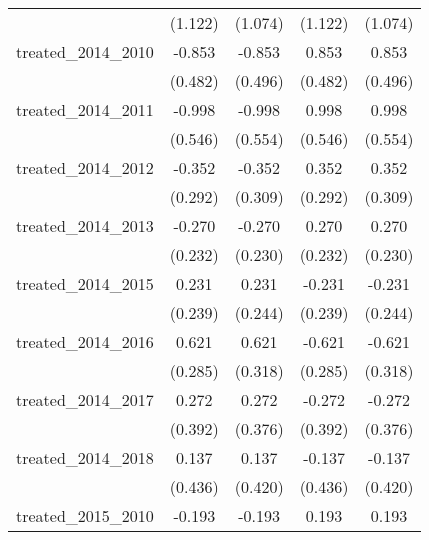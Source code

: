 {\begin{tabular}{l*{4}{c}}
            &     (1.122)         &     (1.074)         &     (1.122)         &     (1.074)         \\
[1em]
treated\_2014\_2010&      -0.853         &      -0.853         &       0.853         &       0.853         \\
            &     (0.482)         &     (0.496)         &     (0.482)         &     (0.496)         \\
[1em]
treated\_2014\_2011&      -0.998         &      -0.998         &       0.998         &       0.998         \\
            &     (0.546)         &     (0.554)         &     (0.546)         &     (0.554)         \\
[1em]
treated\_2014\_2012&      -0.352         &      -0.352         &       0.352         &       0.352         \\
            &     (0.292)         &     (0.309)         &     (0.292)         &     (0.309)         \\
[1em]
treated\_2014\_2013&      -0.270         &      -0.270         &       0.270         &       0.270         \\
            &     (0.232)         &     (0.230)         &     (0.232)         &     (0.230)         \\
[1em]
treated\_2014\_2015&       0.231         &       0.231         &      -0.231         &      -0.231         \\
            &     (0.239)         &     (0.244)         &     (0.239)         &     (0.244)         \\
[1em]
treated\_2014\_2016&       0.621\sym{*}  &       0.621         &      -0.621\sym{*}  &      -0.621         \\
            &     (0.285)         &     (0.318)         &     (0.285)         &     (0.318)         \\
[1em]
treated\_2014\_2017&       0.272         &       0.272         &      -0.272         &      -0.272         \\
            &     (0.392)         &     (0.376)         &     (0.392)         &     (0.376)         \\
[1em]
treated\_2014\_2018&       0.137         &       0.137         &      -0.137         &      -0.137         \\
            &     (0.436)         &     (0.420)         &     (0.436)         &     (0.420)         \\
[1em]
treated\_2015\_2010&      -0.193         &      -0.193         &       0.193         &       0.193         \\

\end{tabular}}
